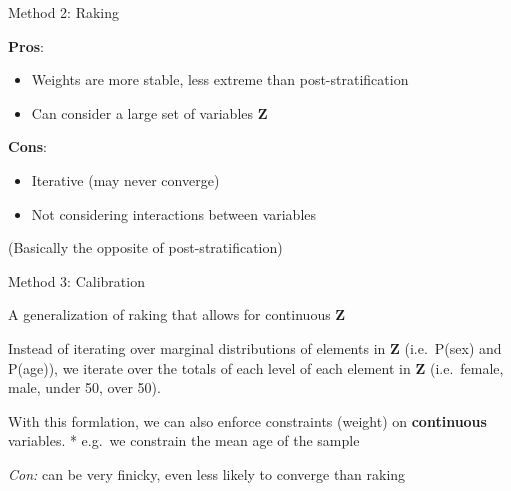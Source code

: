 \documentclass[
  ignorenonframetext,
]{beamer}
\providecommand{\tightlist}{%
  \setlength{\itemsep}{0pt}\setlength{\parskip}{0pt}}
\begin{document}
\begin{frame}{Method 2: Raking}
\protect\hypertarget{method-2-raking-1}{}

\textbf{Pros}:

\begin{itemize}
\tightlist
\item
  Weights are more stable, less extreme than post-stratification
\item
  Can consider a large set of variables \(\mathbf{Z}\)
\end{itemize}

\textbf{Cons}:

\begin{itemize}
\tightlist
\item
  Iterative (may never converge)
\item
  Not considering interactions between variables
\end{itemize}

(Basically the opposite of post-stratification)

\end{frame}

\begin{frame}{Method 3: Calibration}
\protect\hypertarget{method-3-calibration}{}

A generalization of raking that allows for continuous \(\mathbf{Z}\)

Instead of iterating over marginal distributions of elements in
\(\mathbf{Z}\) (i.e.~P(sex) and P(age)), we iterate over the totals of
each level of each element in \(\mathbf{Z}\) (i.e.~female, male, under
50, over 50).

With this formlation, we can also enforce constraints (weight) on
\textbf{continuous} variables. * e.g.~we constrain the mean age of the
sample

\emph{Con:} can be very finicky, even less likely to converge than
raking

\end{frame}
\end{document}
